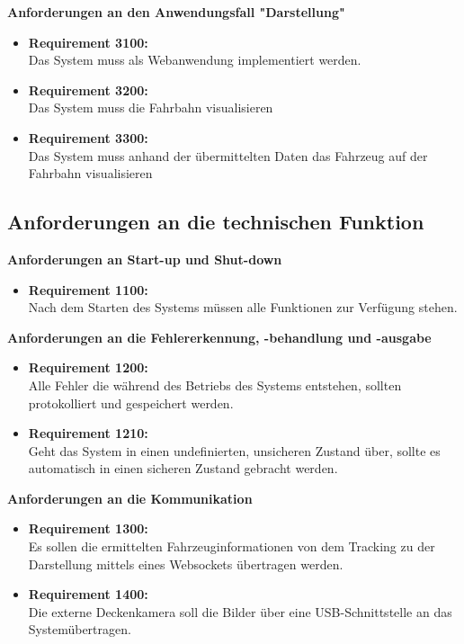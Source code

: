 \textbf{Anforderungen an den Anwendungsfall "Darstellung"}
\begin{itemize}
\item \textbf{Requirement 3100:}\\
Das System muss als Webanwendung implementiert werden.
\item \textbf{Requirement 3200:}\\
Das System muss die Fahrbahn visualisieren
\item \textbf{Requirement 3300:}\\
Das System muss anhand der \"ubermittelten Daten das Fahrzeug auf der Fahrbahn visualisieren
\end{itemize}

\subsection{Anforderungen an die technischen Funktion}
\textbf{Anforderungen an Start-up und Shut-down}
\begin{itemize}
\item \textbf{Requirement 1100:}\\
Nach dem Starten des Systems m\"ussen alle Funktionen zur Verf\"ugung stehen.
\end{itemize}

\textbf{Anforderungen an die Fehlererkennung, -behandlung und -ausgabe}
\begin{itemize}
\item \textbf{Requirement 1200:}\\
Alle Fehler die w\"ahrend des Betriebs des Systems entstehen, sollten protokolliert und
gespeichert werden.
\item \textbf{Requirement 1210:}\\
Geht das System in einen undefinierten, unsicheren Zustand \"uber, sollte es automatisch in einen sicheren Zustand gebracht werden.
\end{itemize}

\textbf{Anforderungen an die Kommunikation}
\begin{itemize}
\item \textbf{Requirement 1300:}\\
Es sollen die ermittelten Fahrzeuginformationen von dem Tracking zu der Darstellung mittels eines Websockets \"ubertragen werden.
\item \textbf{Requirement 1400:}\\
Die externe Deckenkamera soll die Bilder \"uber eine USB-Schnittstelle an das System\"ubertragen.
\end{itemize}

